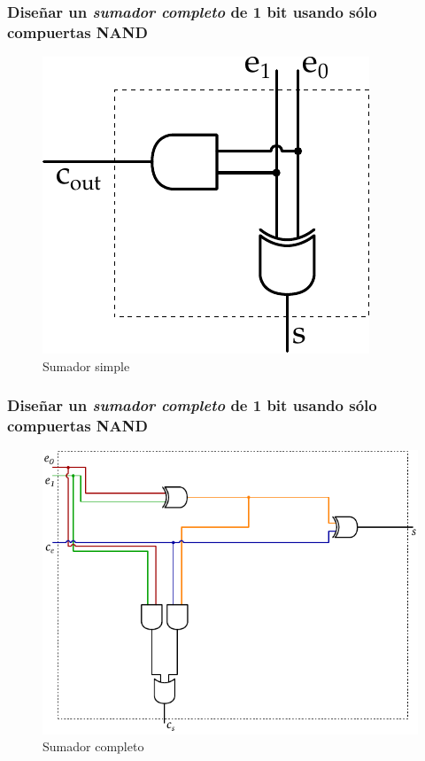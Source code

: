 \documentclass[mathserif,hyperref]{beamer}
\begin{document}
\begin{frame}
\frametitle{\small Diseñar un \textit{sumador completo} de 1 bit usando sólo
compuertas NAND}
\begin{figure}[htp]
  \caption{Sumador simple}
  \includegraphics[scale=0.9]{sumador-simple.pdf}
\end{figure}
\end{frame}


\begin{frame}
\frametitle{\small Diseñar un \textit{sumador completo} de 1 bit usando sólo
compuertas NAND}
\begin{figure}[htp]
  \caption{Sumador completo}
  \includegraphics[scale=0.7]{sumador-completo.pdf}
\end{figure}
\end{frame}
\end{document}

